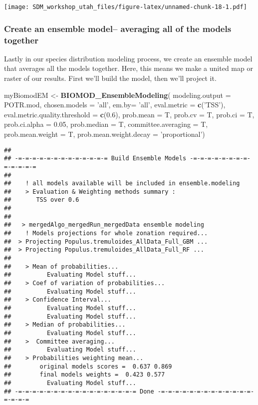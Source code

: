 \documentclass[]{article}
\newenvironment{Shaded}{\begin{snugshade}}{\end{snugshade}}
\newcommand{\KeywordTok}[1]{\textcolor[rgb]{0.13,0.29,0.53}{\textbf{#1}}}
\newcommand{\DataTypeTok}[1]{\textcolor[rgb]{0.13,0.29,0.53}{#1}}
\newcommand{\FloatTok}[1]{\textcolor[rgb]{0.00,0.00,0.81}{#1}}
\newcommand{\StringTok}[1]{\textcolor[rgb]{0.31,0.60,0.02}{#1}}
\newcommand{\NormalTok}[1]{#1}
\begin{document}
\texttt{[image: SDM\_workshop\_utah\_files/figure-latex/unnamed-chunk-18-1.pdf]}

\subsubsection{Create an ensemble model-- averaging all of the models
together}\label{create-an-ensemble-model-averaging-all-of-the-models-together}

Lastly in our species distribution modeling process, we create an
ensemble model that averages all the models together. Here, this means
we make a united map or raster of our results. First we'll build the
model, then we'll project it.

\begin{Shaded}
\begin{Highlighting}[]
\NormalTok{myBiomodEM <-}\StringTok{ }\KeywordTok{BIOMOD_EnsembleModeling}\NormalTok{(}
                  \DataTypeTok{modeling.output =}\NormalTok{ POTR.mod,}
                  \DataTypeTok{chosen.models =} \StringTok{'all'}\NormalTok{,}
                  \DataTypeTok{em.by=} \StringTok{'all'}\NormalTok{,}
                  \DataTypeTok{eval.metric =} \KeywordTok{c}\NormalTok{(}\StringTok{'TSS'}\NormalTok{),}
                  \DataTypeTok{eval.metric.quality.threshold =} \KeywordTok{c}\NormalTok{(}\FloatTok{0.6}\NormalTok{),}
                  \DataTypeTok{prob.mean =}\NormalTok{ T,}
                  \DataTypeTok{prob.cv =}\NormalTok{ T,}
                  \DataTypeTok{prob.ci =}\NormalTok{ T,}
                  \DataTypeTok{prob.ci.alpha =} \FloatTok{0.05}\NormalTok{,}
                  \DataTypeTok{prob.median =}\NormalTok{ T,}
                  \DataTypeTok{committee.averaging =}\NormalTok{ T,}
                  \DataTypeTok{prob.mean.weight =}\NormalTok{ T,}
                  \DataTypeTok{prob.mean.weight.decay =} \StringTok{'proportional'}\NormalTok{)}
\end{Highlighting}
\end{Shaded}

\begin{verbatim}
## 
## -=-=-=-=-=-=-=-=-=-=-=-=-= Build Ensemble Models -=-=-=-=-=-=-=-=-=-=-=-=-=
## 
##    ! all models available will be included in ensemble.modeling
##    > Evaluation & Weighting methods summary :
##       TSS over 0.6
## 
## 
##   > mergedAlgo_mergedRun_mergedData ensemble modeling
##    ! Models projections for whole zonation required...
##  > Projecting Populus.tremuloides_AllData_Full_GBM ...
##  > Projecting Populus.tremuloides_AllData_Full_RF ...
## 
##    > Mean of probabilities...
##          Evaluating Model stuff...
##    > Coef of variation of probabilities...
##          Evaluating Model stuff...
##    > Confidence Interval...
##          Evaluating Model stuff...
##          Evaluating Model stuff...
##    > Median of probabilities...
##          Evaluating Model stuff...
##    >  Committee averaging...
##          Evaluating Model stuff...
##    > Probabilities weighting mean...
##        original models scores =  0.637 0.869
##        final models weights =  0.423 0.577
##          Evaluating Model stuff...
## -=-=-=-=-=-=-=-=-=-=-=-=-=-=-=-=-= Done -=-=-=-=-=-=-=-=-=-=-=-=-=-=-=-=-=
\end{verbatim}
\end{document}
